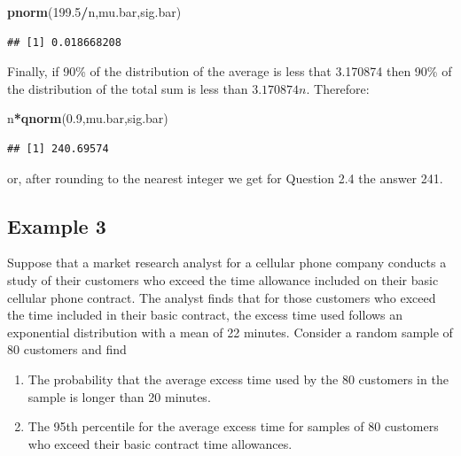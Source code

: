 \documentclass[]{krantz}
\makeatletter
\newenvironment{Shaded}{\begin{snugshade}}{\end{snugshade}}
\newcommand{\KeywordTok}[1]{\textcolor[rgb]{0.13,0.29,0.53}{\textbf{#1}}}
\newcommand{\FloatTok}[1]{\textcolor[rgb]{0.00,0.00,0.81}{#1}}
\newcommand{\OperatorTok}[1]{\textcolor[rgb]{0.81,0.36,0.00}{\textbf{#1}}}
\newcommand{\NormalTok}[1]{#1}
\newenvironment{kframe}{%
\medskip{}
\setlength{\fboxsep}{.8em}
 \def\at@end@of@kframe{}%
 \ifinner\ifhmode%
  \def\at@end@of@kframe{\end{minipage}}%
  \begin{minipage}{\columnwidth}%
 \fi\fi%
 \def\FrameCommand##1{\hskip\@totalleftmargin \hskip-\fboxsep
 \colorbox{shadecolor}{##1}\hskip-\fboxsep
     \hskip-\linewidth \hskip-\@totalleftmargin \hskip\columnwidth}%
 \MakeFramed {\advance\hsize-\width
   \@totalleftmargin\z@ \linewidth\hsize
   \@setminipage}}%
 {\par\unskip\endMakeFramed%
 \at@end@of@kframe}
\renewenvironment{Shaded}{\begin{kframe}}{\end{kframe}}
\theoremstyle{definition}
\theoremstyle{definition}
\theoremstyle{definition}
\theoremstyle{remark}
\makeatother
\begin{document}
\begin{Shaded}
\begin{Highlighting}[]
\KeywordTok{pnorm}\NormalTok{(}\FloatTok{199.5}\OperatorTok{/}\NormalTok{n,mu.bar,sig.bar)}
\end{Highlighting}
\end{Shaded}

\begin{verbatim}
## [1] 0.018668208
\end{verbatim}

Finally, if 90\% of the distribution of the average is less that
3.170874 then 90\% of the distribution of the total sum is less than
\(3.170874 n\). Therefore:

\begin{Shaded}
\begin{Highlighting}[]
\NormalTok{n}\OperatorTok{*}\KeywordTok{qnorm}\NormalTok{(}\FloatTok{0.9}\NormalTok{,mu.bar,sig.bar)}
\end{Highlighting}
\end{Shaded}

\begin{verbatim}
## [1] 240.69574
\end{verbatim}

or, after rounding to the nearest integer we get for Question 2.4 the
answer 241.

\subsection{Example 3}\label{example-3}

Suppose that a market research analyst for a cellular phone company
conducts a study of their customers who exceed the time allowance
included on their basic cellular phone contract. The analyst finds that
for those customers who exceed the time included in their basic
contract, the excess time used follows an exponential distribution with
a mean of 22 minutes. Consider a random sample of 80 customers and find

\begin{enumerate}
\def\labelenumi{\arabic{enumi}.}
\item
  The probability that the average excess time used by the 80 customers
  in the sample is longer than 20 minutes.
\item
  The 95th percentile for the average excess time for samples of 80
  customers who exceed their basic contract time allowances.
\end{enumerate}
\end{document}
